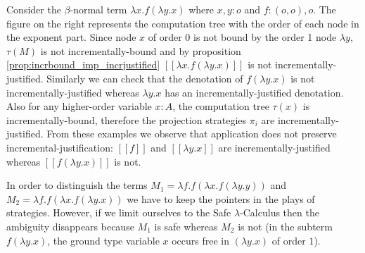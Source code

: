 \documentclass{llncs}
\newcommand{\lsem}{[\![} %
\newcommand{\rsem}{]\!]} %
\newcommand{\sem}[1]{{\lsem #1 \rsem}}
\begin{document}
\begin{example}
Consider the $\beta$-normal term $\lambda
x . f (\lambda y .x)$ where $x,y:o$ and $f:(o,o),o$. The figure on
the right represents the computation tree with the order of each
node in the exponent part. Since node $x$ of order $0$ is not bound
by the order 1 node $\lambda y$, $\tau(M)$ is not
incrementally-bound and by proposition
\ref{prop:incrbound_imp_incrjustified} $\sem{\lambda x . f (\lambda
y .x)}$ is not incrementally-justified. Similarly we can check that
the denotation of $f (\lambda y .x)$ is not incrementally-justified
whereas $\lambda y. x$ has an incrementally-justified denotation.
Also for any higher-order variable $x:A$, the computation tree
$\tau(x)$ is incrementally-bound, therefore the projection
strategies $\pi_i$ are incrementally-justified. From these examples
we observe that application does not preserve
incremental-justification: $\sem{f}$ and $\sem{\lambda y. x}$ are
incrementally-justified whereas $\sem{f (\lambda y .x)}$ is not.
\end{example}

\begin{example}
In order to distinguish the terms $M_1 = \lambda f . f
(\lambda x . f (\lambda y .y ))$ and $M_2 = \lambda f . f (\lambda x
. f (\lambda y .x ))$ we have to keep the pointers in the plays of
strategies. However, if we limit ourselves to the Safe
$\lambda$-Calculus then the ambiguity disappears because $M_1$ is
safe whereas $M_2$ is not (in the subterm $f (\lambda y . x)$, the
ground type variable $x$ occurs free in $(\lambda y . x)$ of order $1$).
\end{example}
\end{document}
